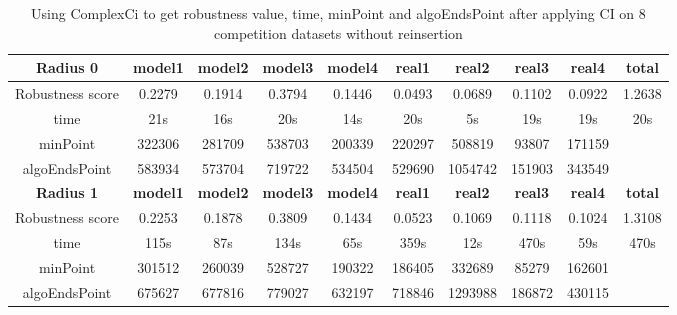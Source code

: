 \documentclass{article}
\begin{document}
	\begin{table}[]
	\begin{adjustwidth}{-1cm}{}		
		\begin{threeparttable}		
			\centering
			\caption{Using ComplexCi to get robustness value, time, minPoint and algoEndsPoint after applying CI on 8 competition datasets without reinsertion}
			\label{tab:table8}
			\begin{tabular}{|c|c|c|c|c|c|c|c|c|c|}
				\hline
				\textbf{Radius 0} & \textbf{model1} & \textbf{model2} & \textbf{model3} & \textbf{model4} & \textbf{real1} & \textbf{real2} & \textbf{real3} & \textbf{real4} & \textbf{total} \\ \hline
				Robustness score                 & 0.2279          & 0.1914          & 0.3794          & 0.1446          & 0.0493         & 0.0689         & 0.1102         & 0.0922         & 1.2638         \\ \hline
				time                             & 21s             & 16s             & 20s             & 14s             & 20s            & 5s             & 19s            & 19s            & 20s            \\ \hline
				minPoint                & 322306          & 281709          & 538703          & 200339          & 220297         & 508819         & 93807          & 171159         &                \\ \hline
				algoEndsPoint           & 583934          & 573704          & 719722          & 534504          & 529690         & 1054742        & 151903         & 343549         &                \\ \hline
				
				\textbf{Radius 1} & \textbf{model1} & \textbf{model2} & \textbf{model3} & \textbf{model4} & \textbf{real1} & \textbf{real2} & \textbf{real3} & \textbf{real4} & \textbf{total} \\ \hline
				Robustness score                 & 0.2253          & 0.1878          & 0.3809          & 0.1434          & 0.0523         & 0.1069         & 0.1118         & 0.1024         & 1.3108         \\ \hline
				time                             & 115s            & 87s             & 134s            & 65s             & 359s           & 12s            & 470s           & 59s            & 470s           \\ \hline
				minPoint                         & 301512          & 260039          & 528727          & 190322          & 186405         & 332689         & 85279          & 162601         &                \\ \hline
				algoEndsPoint                    & 675627          & 677816          & 779027          & 632197          & 718846         & 1293988        & 186872         & 430115         &                \\ \hline		
				

\end{tabular}
\end{threeparttable}
\end{adjustwidth}
\end{table}
\end{document}
